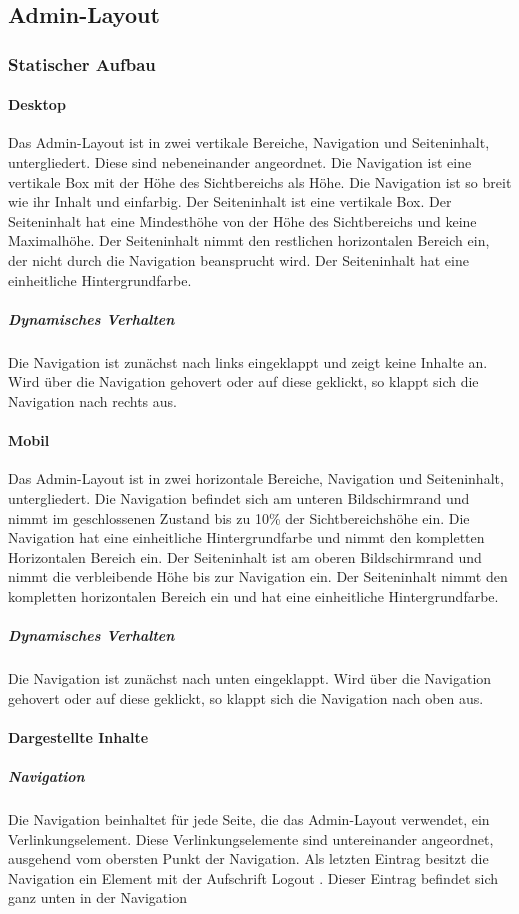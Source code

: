 \subsection{Admin-Layout}

\subsubsection{Statischer Aufbau}
\paragraph*{Desktop}
Das Admin-Layout ist in zwei vertikale Bereiche, Navigation und Seiteninhalt, untergliedert. Diese sind nebeneinander angeordnet.
Die Navigation ist eine vertikale Box mit der Höhe des Sichtbereichs als Höhe.
Die Navigation ist so breit wie ihr Inhalt und einfarbig.
Der Seiteninhalt ist eine vertikale Box. Der Seiteninhalt hat eine Mindesthöhe von der Höhe des Sichtbereichs und keine Maximalhöhe.
Der Seiteninhalt nimmt den restlichen horizontalen Bereich ein, der nicht durch die Navigation beansprucht wird.
Der Seiteninhalt hat eine einheitliche Hintergrundfarbe.

\subparagraph*{Dynamisches Verhalten}
Die Navigation ist zunächst nach links eingeklappt und zeigt keine Inhalte an. Wird über die Navigation gehovert oder auf diese geklickt,
so klappt sich die Navigation nach rechts aus. 

\paragraph*{Mobil}
Das Admin-Layout ist in zwei horizontale Bereiche, Navigation und Seiteninhalt, untergliedert.
Die Navigation befindet sich am unteren Bildschirmrand und nimmt im geschlossenen Zustand bis zu 10\% der Sichtbereichshöhe ein.
Die Navigation hat eine einheitliche Hintergrundfarbe und nimmt den kompletten Horizontalen Bereich ein.
Der Seiteninhalt ist am oberen Bildschirmrand und nimmt die verbleibende Höhe bis zur Navigation ein.
Der Seiteninhalt nimmt den kompletten horizontalen Bereich ein und hat eine einheitliche Hintergrundfarbe.

\subparagraph*{Dynamisches Verhalten}
Die Navigation ist zunächst nach unten eingeklappt. Wird über die Navigation gehovert oder auf diese geklickt,
so klappt sich die Navigation nach oben aus.

\paragraph*{Dargestellte Inhalte}
\subparagraph*{Navigation}
Die Navigation beinhaltet für jede Seite, die das Admin-Layout verwendet, ein Verlinkungselement. 
Diese Verlinkungselemente sind untereinander angeordnet, ausgehend vom obersten Punkt der Navigation.
Als letzten Eintrag besitzt die Navigation ein Element mit der Aufschrift \dq Logout \dq. Dieser Eintrag befindet sich ganz unten in der Navigation


